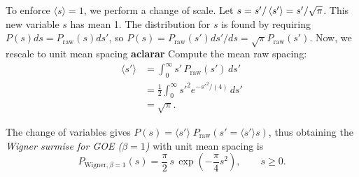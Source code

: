 \documentclass[10pt]{article}
\begin{document}
To enforce $\langle s \rangle = 1$, we perform a change of scale. 
Let $s = s' / \ev{s'} = s' / \sqrt{\pi}$. This new variable $s$ has mean 1. 
The distribution for $s$ is found by requiring 
$P(s)ds = P_{\mathrm{raw}}(s)ds'$, 
so $P(s) = P_{\mathrm{raw}}(s') ds'/ds = \sqrt{\pi}P_{\mathrm{raw}}(s')$.
Now, we rescale to unit mean spacing \textbf{aclarar}
Compute the mean raw spacing:
\begin{align}
\langle s'\rangle &= \int_0^\infty s'\,P_{\text{raw}}(s')\,ds' \\
&= \frac{1}{2}\int_0^\infty {s'}^2
e^{-{s'}^2/(4)}\,ds'
\\
&= \sqrt{\pi}.
\end{align}

The change of variables gives
$P(s) = \langle s'\rangle\;P_{\text{raw}}(s'=\langle s'\rangle s)$,
thus obtaining the \emph{Wigner surmise for GOE ($\beta=1$)} with unit mean 
spacing is
\begin{equation}
\boxed{P_{\mathrm{Wigner},\beta=1}(s) = \frac{\pi}{2}\,s\,
\exp\!\left(-\frac{\pi}{4}s^{2}\right), \qquad s\geq 0.}
\end{equation}

%
%
%
\end{document}
